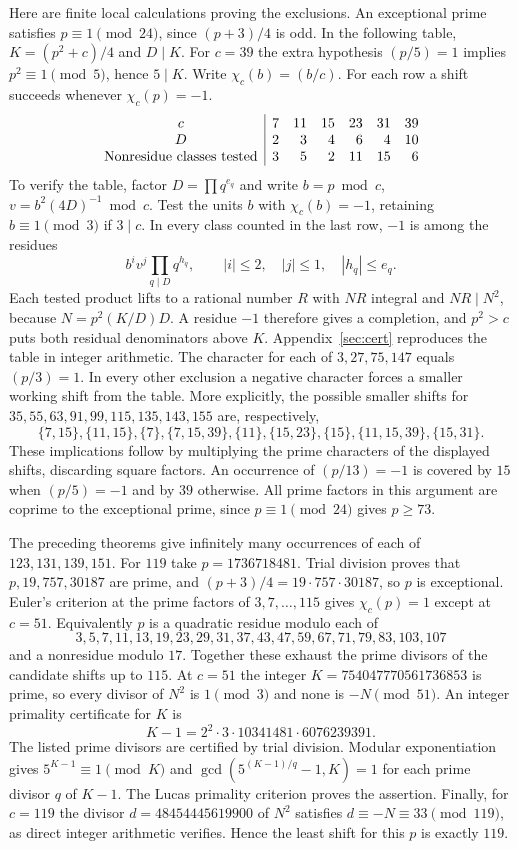 \documentclass[a4paper,11pt]{article}
\theoremstyle{definition}\newtheorem{question}[theorem]{Question}
\begin{document}
Here are finite local calculations proving the exclusions. An exceptional prime satisfies $p\equiv1\pmod{24}$, since $(p+3)/4$ is odd. In the following table, $K=(p^2+c)/4$ and $D\mid K$. For $c=39$ the extra hypothesis $(p/5)=1$ implies $p^2\equiv1\pmod5$, hence $5\mid K$. Write $\chi_c(b)=(b/c)$. For each row a shift succeeds whenever $\chi_c(p)=-1$.
\[
\begin{array}{c|rrrrrr}
 c&7&11&15&23&31&39\rule{0pt}{2.2ex}\\
 D&2&3&4&6&4&10\\
 \text{Nonresidue classes tested}&3&5&2&11&15&6
\end{array}
\]
To verify the table, factor $D=\prod q^{e_q}$ and write $b=p\bmod c$, $v=b^2(4D)^{-1}\bmod c$. Test the units $b$ with $\chi_c(b)=-1$, retaining $b\equiv1\pmod3$ if $3\mid c$. In every class counted in the last row, $-1$ is among the residues
\[
 b^i v^j \prod_{q\mid D}q^{h_q},
 \qquad |i|\le 2,\quad |j|\le1,\quad |h_q|\le e_q .
\]
Each tested product lifts to a rational number $R$ with $NR$ integral and $NR\mid N^2$, because $N=p^2(K/D)D$. A residue $-1$ therefore gives a completion, and $p^2>c$ puts both residual denominators above $K$. Appendix~\ref{sec:cert} reproduces the table in integer arithmetic.
The character for each of $3,27,75,147$ equals $(p/3)=1$. In every other exclusion a negative character forces a smaller working shift from the table. More explicitly, the possible smaller shifts for $35,55,63,91,99,115,135,143,155$ are, respectively,
\[
 \{7,15\},\{11,15\},\{7\},\{7,15,39\},\{11\},
 \{15,23\},\{15\},\{11,15,39\},\{15,31\}.
\]
These implications follow by multiplying the prime characters of the displayed shifts, discarding square factors. An occurrence of $(p/13)=-1$ is covered by $15$ when $(p/5)=-1$ and by $39$ otherwise. All prime factors in this argument are coprime to the exceptional prime, since $p\equiv1\pmod{24}$ gives $p\ge73$.

The preceding theorems give infinitely many occurrences of each of $123,131,139,151$. For $119$ take $p=1736718481$. Trial division proves that $p,19,757,30187$ are prime, and $(p+3)/4=19\cdot757\cdot30187$, so $p$ is exceptional. Euler's criterion at the prime factors of $3,7,\ldots,115$ gives $\chi_c(p)=1$ except at $c=51$. Equivalently $p$ is a quadratic residue modulo each of
\[
 3,5,7,11,13,19,23,29,31,37,43,47,59,67,71,79,83,103,107
\]
and a nonresidue modulo $17$. Together these exhaust the prime divisors of the candidate shifts up to $115$. At $c=51$ the integer $K=754047770561736853$ is prime, so every divisor of $N^2$ is $1\pmod3$ and none is $-N\pmod{51}$. An integer primality certificate for $K$ is
\[
 K-1=2^2\cdot3\cdot10341481\cdot6076239391.
\]
The listed prime divisors are certified by trial division. Modular exponentiation gives $5^{K-1}\equiv1\pmod K$ and $\gcd(5^{(K-1)/q}-1,K)=1$ for each prime divisor $q$ of $K-1$. The Lucas primality criterion proves the assertion. Finally, for $c=119$ the divisor $d=48454445619900$ of $N^2$ satisfies $d\equiv-N\equiv33\pmod{119}$, as direct integer arithmetic verifies. Hence the least shift for this $p$ is exactly $119$.
\end{document}
